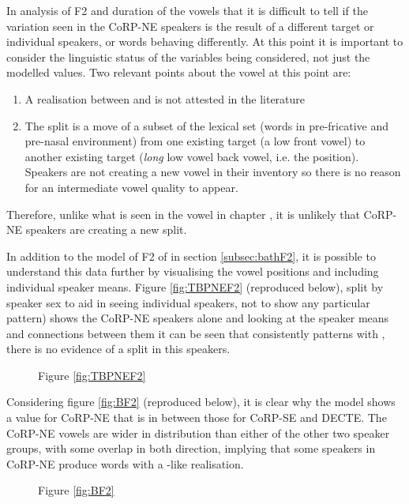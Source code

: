 \documentclass[../../00.FullDoc/tex/Thesis]{subfiles}
\begin{document}
In analysis of F2 and duration of the \bath{} vowels that it is difficult to tell if the variation seen in the CoRP-NE speakers is the result of a different \bath{} target or individual speakers, or words behaving differently. 
At this point it is important to consider the linguistic status of the variables being considered, not just the modelled values. Two relevant points about the \bath{} vowel at this point are:
\begin{enumerate}
	\item A \bath{} realisation between \trap{} and \palm{} is not attested in the literature
	\item The \TB{} split is a move of a subset of the \trap{} lexical set (words in pre-fricative and pre-nasal environment) from one existing target (a low front vowel) to another existing target (\textit{long} low vowel back vowel, i.e. the \palm{} position). Speakers are not creating a new vowel in their inventory so there is no reason for an intermediate vowel quality to appear.
\end{enumerate}
Therefore, unlike what is seen in the \strutt vowel in chapter \notinsubfile{\ref{ch:FS}}, it is unlikely that CoRP-NE speakers are creating a new split.

In addition to the model of F2 of \bath{} in section \ref{subsec:bathF2}, it is possible to understand this data further by visualising the vowel positions and including individual speaker means. Figure \ref{fig:TBPNEF2} (reproduced below), split by speaker sex to aid in seeing individual speakers, not to show any particular pattern) shows the CoRP-NE speakers alone and looking at the speaker means and connections between them it can be seen that \bath{} consistently patterns with \trap{}, there is no evidence of a \TB{} split in this speakers.

\begin{figure}[H]
	
	Figure \ref{fig:TBPNEF2}
\end{figure}

Considering figure \ref{fig:BF2} (reproduced below), it is clear why the model shows a \bath{} value for CoRP-NE that is in between those for CoRP-SE and DECTE. The CoRP-NE \bath{} vowels are wider in distribution than either of the other two speaker groups, with some overlap in both direction, implying that some speakers in CoRP-NE produce \bath{} words with a \palm{}-like realisation.

\begin{figure}[H]
	
	Figure \ref{fig:BF2}
\end{figure}
\end{document}
